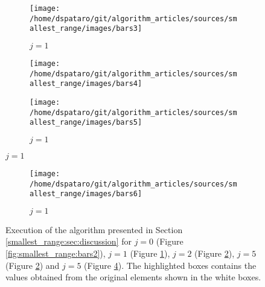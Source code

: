 \begin{figure}\ContinuedFloat
	\vspace{-0.5in}
	\begin{subfigure}{0.99\textwidth}
		\centering
		\texttt{[image: /home/dspataro/git/algorithm\_articles/sources/smallest\_range/images/bars3]}
		\caption{$j=1$}
		\label{fig:smallest_range:bars3}
	\end{subfigure}

	
	\medskip
	\begin{subfigure}{0.99\textwidth}
		\centering
		\texttt{[image: /home/dspataro/git/algorithm\_articles/sources/smallest\_range/images/bars4]}
		\label{fig:smallest_range:bars4}
	\end{subfigure}

	\begin{subfigure}{0.99\textwidth}
		\centering
		\texttt{[image: /home/dspataro/git/algorithm\_articles/sources/smallest\_range/images/bars5]}
		\caption{$j=1$}
		\label{fig:smallest_range:bars5}
	\end{subfigure}
\end{figure}

\begin{figure}\ContinuedFloat
	\begin{subfigure}{0.99\textwidth}
		\centering
		\texttt{[image: /home/dspataro/git/algorithm\_articles/sources/smallest\_range/images/bars6]}
		\caption{$j=1$}
		\label{fig:smallest_range:bars6}
	\end{subfigure}

	\caption{Execution of the algorithm presented in Section \ref{smallest_range:sec:discussion}
	for $j=0$ (Figure \ref{fig:smallest_range:bars2}),  $j=1$ (Figure \ref{fig:smallest_range:bars3}),
	$j=2$ (Figure \ref{fig:smallest_range:bars4}), $j=5$ (Figure \ref{fig:smallest_range:bars4}) 
	and $j=5$ (Figure \ref{fig:smallest_range:bars5}).
	The highlighted boxes contains the values obtained from the original elements
	shown in the white boxes.}
	\label{fig:smallest_range:bars_execution}
\end{figure}